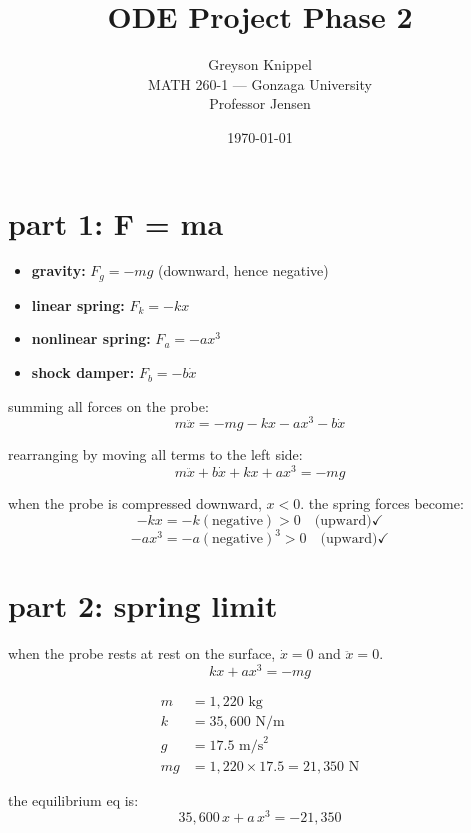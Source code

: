 \documentclass[12pt]{article}
\title{ODE Project Phase 2}
\author{
Greyson Knippel \\[4pt]
MATH 260-1 --- Gonzaga University \\[4pt]
Professor Jensen
}
\date{\today}
\begin{document}
\maketitle

\section{part 1: F = ma}

\begin{itemize}
    \item \textbf{gravity:} $F_g = -mg$ \quad (downward, hence negative)
    \item \textbf{linear spring:} $F_k = -kx$
    \item \textbf{nonlinear spring:} $F_a = -ax^3$
    \item \textbf{shock damper:} $F_b = -b\dot{x}$
\end{itemize}


summing all forces on the probe:
\[
    m\ddot{x} = -mg - kx - ax^3 - b\dot{x}
\]

rearranging by moving all terms to the left side:
\[
    \boxed{m\ddot{x} + b\dot{x} + kx + ax^3 = -mg}
\]


when the probe is compressed downward, $x < 0$. the spring forces become:
\[
    -kx = -k(\text{negative}) > 0 \quad \text{(upward)} \checkmark
\]
\[
    -ax^3 = -a(\text{negative})^3 > 0 \quad \text{(upward)} \checkmark
\]


\section{part 2: spring limit}
when the probe rests at rest on the surface, $\dot{x} = 0$ and $\ddot{x} = 0$.
\[
    kx + ax^3 = -mg
\]


\begin{align*}
    m &= 1{,}220 \text{ kg} \\
    k &= 35{,}600 \text{ N/m} \\
    g &= 17.5 \text{ m/s}^2 \\
    mg &= 1{,}220 \times 17.5 = 21{,}350 \text{ N}
\end{align*}

the equilibrium eq is:
\[
    35{,}600\, x + a\, x^3 = -21{,}350
\]
\end{document}
